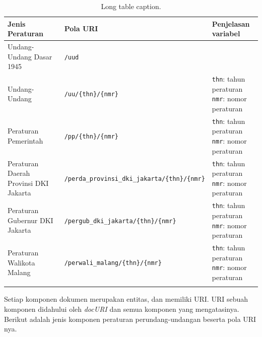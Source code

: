\begin{longtable}[l]{|p{}|p{}|p{}|}
  \hline
  Jenis Peraturan                       & Pola URI                                                & Penjelasan variabel                        \\ \hline \endhead
  Undang-Undang Dasar 1945              & \texttt{/uud}                                           &                                            \\ \hline
  Undang-Undang                         & \texttt{/uu/\{thn\}/\{nmr\}}                            & \makecell[l]{\texttt{thn}: tahun peraturan \\\texttt{nmr}: nomor peraturan} \\ \hline
  Peraturan Pemerintah                  & \texttt{/pp/\{thn\}/\{nmr\}}                            & \makecell[l]{\texttt{thn}: tahun peraturan \\\texttt{nmr}: nomor peraturan} \\\hline
  Peraturan Daerah Provinsi DKI Jakarta & \texttt{/perda\_provinsi\_dki\_jakarta/\{thn\}/\{nmr\}} & \makecell[l]{\texttt{thn}: tahun peraturan \\\texttt{nmr}: nomor peraturan} \\\hline
  Peraturan Gubernur DKI Jakarta        & \texttt{/pergub\_dki\_jakarta/\{thn\}/\{nmr\}}          & \makecell[l]{\texttt{thn}: tahun peraturan \\\texttt{nmr}: nomor peraturan} \\\hline
  Peraturan Walikota Malang             & \texttt{/perwali\_malang/\{thn\}/\{nmr\}}               & \makecell[l]{\texttt{thn}: tahun peraturan \\\texttt{nmr}: nomor peraturan} \\\hline
  \caption{Long table caption.\label{longs2}}                                                                                                  \\
\end{longtable}

Setiap komponen dokumen merupakan entitas, dan memiliki URI. URI sebuah komponen didahului oleh
\emph{docURI} dan semua komponen yang mengatasinya. Berikut adalah jenis komponen peraturan
perundang-undangan beserta pola URI nya.

